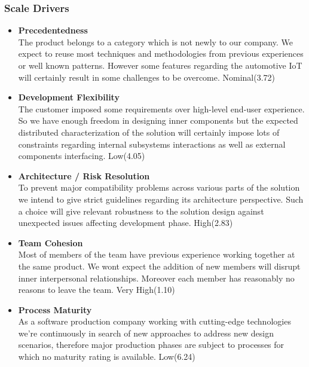 \subsubsection{Scale Drivers}
\begin{itemize}
    \item \textbf{Precedentedness}\\
    The product belongs to a category which is not newly to our company. We expect to reuse most techniques and methodologies from previous experiences or well known patterns. However some features regarding the automotive IoT will certainly result in some challenges to be overcome.
    \hfill Nominal(3.72)
    
    \item \textbf{Development Flexibility}\\
    The customer imposed some requirements over high-level end-user experience. So we have enough freedom in designing inner components but the expected distributed characterization of the solution will certainly impose lots of constraints regarding internal subsystems interactions as well as external components interfacing.
    \hfill Low(4.05)
    
    \item \textbf{Architecture / Risk Resolution}\\
    To prevent major compatibility problems across various parts of the solution we intend to give strict guidelines regarding its architecture perspective. Such a choice will give relevant robustness to the solution design against unexpected issues affecting development phase.
    \hfill High(2.83)
    
    \item \textbf{Team Cohesion}\\
    Most of members of the team have previous experience working together at the same product. We wont expect the addition of new members will disrupt inner interpersonal relationships. Moreover each member has reasonably no reasons to leave the team.
    \hfill Very High(1.10)
    
    \item \textbf{Process Maturity}\\
    As a software production company working with cutting-edge technologies we're continuously in search of new approaches to address new design scenarios, therefore major production phases are subject to processes for which no maturity rating is available.
    \hfill Low(6.24)
\end{itemize}

